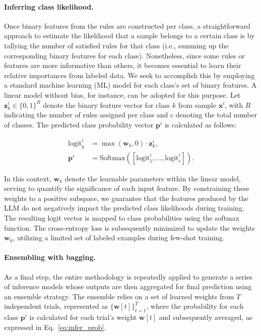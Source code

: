 \paragraph{Inferring class likelihood.} Once binary features from the rules are constructed per class, a straightforward approach to estimate the likelihood that a sample belongs to a certain class is by tallying the number of satisfied rules for that class (i.e., summing up the corresponding binary features for each class). Nonetheless, since some rules or features are more informative than others, it becomes essential to learn their relative importances from labeled data. We seek to accomplish this by employing a standard machine learning (ML) model for each class’s set of binary features. A linear model without bias, for instance, can be adopted for this purpose. Let $\mathbf{z}_k^i \in \{0, 1\}^R$ denote the binary feature vector for class $k$ from sample $\mathbf{x}^i$, with $R$ indicating the number of rules assigned per class and $c$ denoting the total number of classes. The predicted class probability vector $\mathbf{p}^i$ is calculated as follows:

\begin{align}
\text{logit}_k^i &= \max(\mathbf{w}_k, 0) \cdot \mathbf{z}_k^i, \nonumber \\
\mathbf{p}^i &= \text{Softmax}({[\text{logit}_{1}^i, ..., \text{logit}_{c}^i]}). \label{eq:infer_prob}
\end{align}

In this context, $\mathbf{w}_k$ denote the learnable parameters within the linear model, serving to quantify the significance of each input feature. By constraining these weights to a positive subspace, we guarantee that the features produced by the LLM do not negatively impact the predicted class likelihoods during training. The resulting logit vector is mapped to class probabilities using the softmax function. The cross-entropy loss is subsequently minimized to update the weights $\mathbf{w}_k$, utilizing a limited set of labeled examples during few-shot training.

\vspace*{-0.12in}
\paragraph{Ensembling with bagging.} As a final step, the entire methodology is repeatedly applied to generate a series of inference models whose outputs are then aggregated for final prediction using an ensemble strategy. The ensemble relies on a set of learned weights from $T$ independent trials, represented as $\{\mathbf{w}[t]\}_{t=1}^T$, where the probability for each class $\mathbf{p}^i$ is calculated for each trial's weight $\mathbf{w}[t]$ and subsequently averaged, as expressed in Eq.~\ref{eq:infer_prob}.

